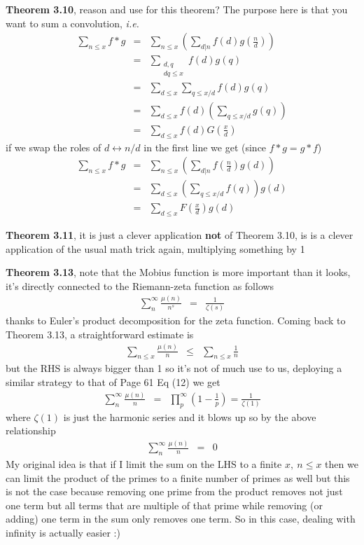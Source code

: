 \documentclass[aps,preprint,preprintnumbers,nofootinbib,showpacs,prd]{revtex4-1}
\newcommand{\ie}{{\it i.e.} }
\newcommand{\nbea}{\begin{eqnarray*}}
\newcommand{\neea}{\end{eqnarray*}}
\begin{document}
{\bf Theorem 3.10}, reason and use for this theorem? The purpose here is that you want to sum a convolution, \ie
%
\nbea
\sum_{n \le x} f * g & = & \sum_{n \le x} \left(\sum_{d|n} f(d) g\left(\frac{n}{d}\right)\right) \\
& = & \sum_{\substack{d,q\\dq\le x}} f(d) g(q) \\
& = & \sum_{d\le x} \sum_{q \le x/d} f(d) g(q) \\
& = & \sum_{d\le x} f(d) \left (\sum_{q \le x/d} g(q) \right )\\
& = & \sum_{d\le x} f(d) G\left(\frac{x}{d}\right)
\neea
%
if we swap the roles of $d \leftrightarrow n/d$ in the first line we get (since $f * g = g * f$)
%
\nbea
\sum_{n \le x} f * g & = & \sum_{n \le x} \left(\sum_{d|n} f\left(\frac{n}{d}\right) g\left(d\right)\right) \\
& = & \sum_{d\le x} \left (\sum_{q \le x/d} f(q) \right ) g(d) \\
& = & \sum_{d\le x} F\left(\frac{x}{d}\right) g(d)
\neea
%

{\bf Theorem 3.11}, it is just a clever application {\bf not} of Theorem 3.10, is is a clever application of the usual math trick again, multiplying something by 1

{\bf Theorem 3.13}, note that the Mobius function is more important than it looks, it's directly connected to the Riemann-zeta function as follows
%
\nbea
\sum_{n}^\infty \frac{\mu(n)}{n^s} & = & \frac{1}{\zeta(s)}
\neea
%
thanks to Euler's product decomposition for the zeta function. Coming back to Theorem 3.13, a straightforward estimate is
%
\nbea
\sum_{n\le x} \frac{\mu(n)}{n} & \le & \sum_{n\le x} \frac{1}{n}
\neea
%
but the RHS is always bigger than 1 so it's not of much use to us, deploying a similar strategy to that of Page 61 Eq (12) we get
%
\nbea
\sum_{n}^{\infty} \frac{\mu(n)}{n} & = & \prod_p^\infty \left(1 - \frac{1}{p}\right) = \frac{1}{\zeta(1)}
\neea
%
where $\zeta(1)$ is just the harmonic series and it blows up so by the above relationship
%
\nbea
\sum_{n}^{\infty} \frac{\mu(n)}{n} & = & 0
\neea
%
My original idea is that if I limit the sum on the LHS to a finite $x, ~n\le x$ then we can limit the product of the primes to a finite number of primes as well but this is not the case because removing one prime from the product removes not just one term but all terms that are multiple of that prime while removing (or adding) one term in the sum only removes one term. So in this case, dealing with infinity is actually easier :)
\end{document}
